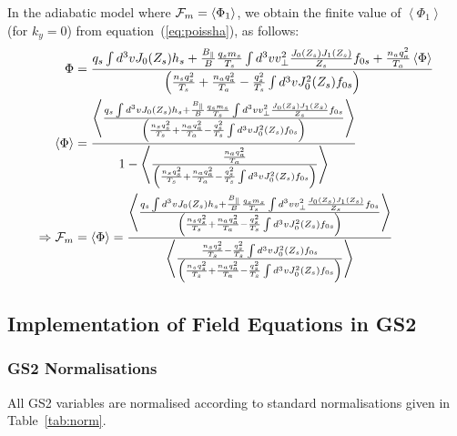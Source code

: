 \documentclass[10pt,a4paper]{article}
\newcommand{\flav}[1]{\left\langle{#1}\right\rangle}
\begin{document}
In the adiabatic model where ${\cal F}_{m} = \flav{\Phi_1}$, we obtain the
finite value of $\flav{\Phi_1}$ (for $k_y=0$) from
equation~(\ref{eq:poissha}), as follows: \small
\begin{align}
  \Phi & = \frac{q_s \int d^3v J_0(Z_s) h_s + \frac{B_{\parallel}}{B}
    \frac{q_s m_s}{T_s} \int d^3v v_{\perp}^2 \frac{J_0(Z_s) J_1(Z_s)}{Z_s}
    f_{0s} + \frac{n_a q_a^2}{T_a} \flav{\Phi}} {\left( \frac{n_s q_s^2}{T_s}
      + \frac{n_a q_a^2}{T_a} - \frac{q_s^2}{T_s}
      \int d^3v J_0^2(Z_s) f_{0s} \right)} \nonumber \\
  \flav{\Phi} & = \frac{\flav{ \frac{q_s \int d^3v J_0(Z_s) h_s +
        \frac{B_{\parallel}}{B} \frac{q_s m_s}{T_s} \int d^3v v_{\perp}^2
        \frac{J_0(Z_s) J_1(Z_s)}{Z_s} f_{0s} } {\left( \frac{n_s q_s^2}{T_s} +
          \frac{n_a q_a^2}{T_a} - \frac{q_s^2}{T_s} \int d^3v J_0^2(Z_s)
          f_{0s} \right)}}} {1-\flav{ \frac{ \frac{n_a q_a^2}{T_a}}{\left(
          \frac{n_s q_s^2}{T_s} + \frac{n_a q_a^2}{T_a} - \frac{q_s^2}{T_s}
          \int d^3v J_0^2(Z_s)
          f_{0s} \right)}}} \nonumber \\
  \Rightarrow {\cal F}_m & = \flav{\Phi} = \frac{\flav{ \frac{q_s \int d^3v
        J_0(Z_s) h_s + \frac{B_{\parallel}}{B} \frac{q_s m_s}{T_s} \int d^3v
        v_{\perp}^2 \frac{J_0(Z_s) J_1(Z_s)}{Z_s} f_{0s} } {\left( \frac{n_s
            q_s^2}{T_s} + \frac{n_a q_a^2}{T_a} - \frac{q_s^2}{T_s} \int d^3v
          J_0^2(Z_s) f_{0s} \right)}}} {\flav{ \frac{\frac{n_s q_s^2}{T_s} -
        \frac{q_s^2}{T_s} \int d^3v J_0^2(Z_s) f_{0s} }{\left( \frac{n_s
            q_s^2}{T_s} + \frac{n_a q_a^2}{T_a} - \frac{q_s^2}{T_s} \int d^3v
          J_0^2(Z_s) f_{0s} \right)}}} \label{eq:phiavg}
\end{align}
\normalsize

\subsection{Implementation of Field Equations in GS2}

\subsubsection{GS2 Normalisations}

All GS2 variables are normalised according to standard normalisations given in
Table~\ref{tab:norm}.
\end{document}
